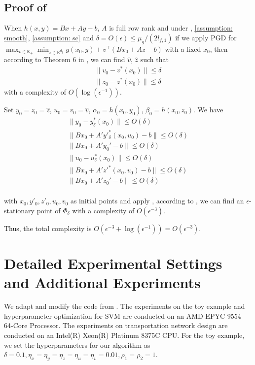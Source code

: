 \documentclass{article}
\def\R{\mathbb{R}}
\theoremstyle{plain}
\theoremstyle{definition}
\theoremstyle{remark}
\begin{document}
\subsection*{Proof of }
When $h(x,y)=Bx+Ay-b$, $A$ is full row rank and under , \ref{assumption: smooth}, \ref{assumption: sc} and $\delta=O(\epsilon)\leq \mu_g/(2l_{f,1})$ if we apply PGD for $\max_{v\in \R_+}\min_{z \in \R^{d_y}}g(x_0,y)+v^\top(Bx_0+Az-b)$ with a fixed $x_0$, then according to Theorem 6 in \cite{jiang2024primal}, we can find $\hat v$, $\hat z$ such that
\begin{align*}
    \|v_0-v^*(x_0)\|\leq \delta\\
    \|z_0-z^*(x_0)\|\leq \delta
\end{align*}
with a complexity of $O(\log(\epsilon^{-1}))$.

Set $y_0=z_0=\hat z$, $u_0=v_0=\hat v$, $\alpha_0=h(x_0,y_0)$, $\beta_0=h(x_0,z_0)$. We have
\begin{align*}
        \|y_0-y^*_\delta(x_0)\|\leq O(\delta)\\
        \|Bx_0+A'y'^*_\delta(x_0,u_0)-b\|\leq O(\delta)\\
        \|Bx_0+A'y_0'-b\|\leq O(\delta)\\
        \|u_0-u^*_\delta(x_0)\|\leq O(\delta)\\
        \|Bx_0+A'z'^*(x_0,v_0)-b\|\leq O(\delta)\\
        \|Bx_0+A'z_0'-b\|\leq O(\delta)\\
\end{align*}

with $x_0, y'_0, z'_0, u_0, v_0$ as initial points and apply , according to , we can find an $\epsilon$-stationary point of $\Phi_\delta$
with a complexity of $O(\epsilon^{-3})$.

Thus, the total complexity is $O(\epsilon^{-3}+\log(\epsilon^{-1}))=O(\epsilon^{-3})$.

\section{Detailed Experimental Settings and Additional Experiments}\label{app: exp}
We adapt and modify the code from \cite{jiang2024primal}. The experiments on the toy example and hyperparameter optimization for SVM are conducted on an AMD EPYC 9554 64-Core Processor. The experiments on transportation network design are conducted on an Intel(R) Xeon(R) Platinum 8375C CPU.
For the toy example, we set the hyperparameters for our algorithm as $\delta=0.1, \eta_x=\eta_y=\eta_z=\eta_u=\eta_v=0.01, \rho_1=\rho_2=1$. 
\end{document}
